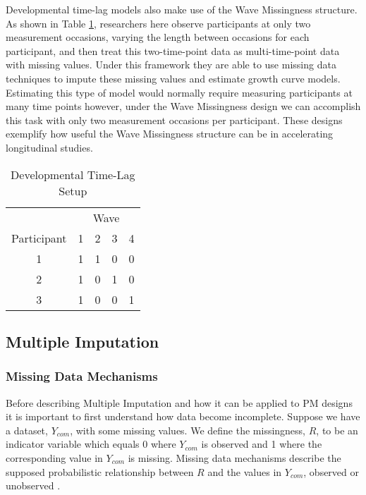 \documentclass{svjour3}                     %
\begin{document}
Developmental time-lag models \citep{mcardle1997expanding} also make use of the Wave Missingness structure. As shown in Table \ref{tab:table13}, researchers here observe participants at only two measurement occasions, varying the length between occasions for each participant, and then treat this two-time-point data as multi-time-point data with missing values. Under this framework they are able to use missing data techniques to impute these missing values and estimate growth curve models. Estimating this type of model would normally require measuring participants at many time points however, under the Wave Missingness design we can accomplish this task with only two measurement occasions per participant. These designs exemplify how useful the Wave Missingness structure can be in accelerating longitudinal studies. \par

\begin{table}[b!]
	\centering
	\caption{Developmental Time-Lag Setup}
	\label{tab:table13}
	\setlength{\tabcolsep}{0.75cm}
	\begin{tabular}{c|cccc}
		\toprule
		& \multicolumn{4}{c}{Wave} \\
		Participant & 1 & 2 & 3 & 4 \\
		\midrule
		1 & 1 & 1 & 0 & 0 \\
		2 & 1 & 0 & 1 & 0 \\
		3 & 1 & 0 & 0 & 1 \\
		\bottomrule
	\end{tabular}
\end{table}

\subsection{Multiple Imputation}
\label{sec:1.3}
\subsubsection{Missing Data Mechanisms}
\label{sec:1.3.1}
Before describing Multiple Imputation and how it can be applied to PM designs it is important to first understand how data become incomplete. Suppose we have a dataset, $Y_{com}$, with some missing values. We define the missingness, $R$, to be an indicator variable which equals 0 where $Y_{com}$ is observed and 1 where the corresponding value in $Y_{com}$ is missing. Missing data mechanisms describe the supposed probabilistic relationship between $R$ and the values in $Y_{com}$, observed or unobserved \citep{little2014statistical}. \par
\end{document}
